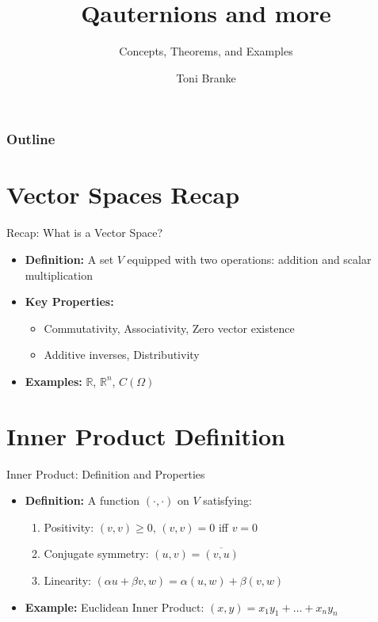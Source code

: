 \documentclass[
	aspectratio=169,    %
	onlytextwidth,        %
	t,                    %
]{beamer}
\title[Qauternions and more]{Qauternions and more}
\subtitle{Concepts, Theorems, and Examples}
\author[Toni Branke]{Toni Branke}
\begin{document}
\begin{frame}[plain]
    \titlepage
\end{frame}

\begin{frame}[plain]
    \frametitle{Outline}
    \tableofcontents
\end{frame}

\section{Vector Spaces Recap}
\begin{frame}{Recap: What is a Vector Space?}
    \begin{itemize}
        \item \textbf{Definition:} A set $V$ equipped with two operations: addition and scalar multiplication
        \item \textbf{Key Properties:}
        \begin{itemize}
            \item Commutativity, Associativity, Zero vector existence
            \item Additive inverses, Distributivity
        \end{itemize}
        \item \textbf{Examples:} $\mathbb{R}$, $\mathbb{R}^n$, $C(\Omega)$
    \end{itemize}
\end{frame}

\section{Inner Product Definition}
\begin{frame}{Inner Product: Definition and Properties}
    \begin{itemize}
        \item \textbf{Definition:} A function $(\cdot,\cdot)$ on $V$ satisfying:
        \begin{enumerate}
            \item Positivity: $(v,v) \geq 0$, $(v,v) = 0$ iff $v = 0$
            \item Conjugate symmetry: $(u,v) = \overline{(v,u)}$
            \item Linearity: $(\alpha u + \beta v, w) = \alpha (u,w) + \beta (v,w)$
        \end{enumerate}
        \item \textbf{Example:} Euclidean Inner Product: $(x,y) = x_1y_1 + \dots + x_ny_n$
    \end{itemize}
\end{frame}
\end{document}
